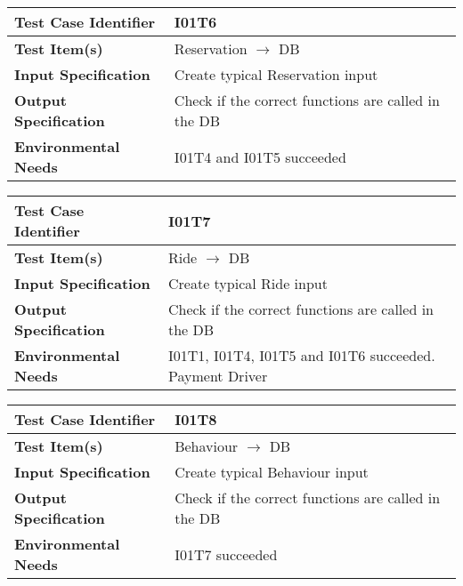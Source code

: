 \begin{center}
	\vspace{0.6cm}
	\begin{tabular}{|l|l|}
		\hline
		\textbf{Test Case Identifier} & I01T6 \bigstrut \\\hline
		\textbf{Test Item(s)} & Reservation \ensuremath{\rightarrow} DB \bigstrut \\\hline
		\textbf{Input Specification} & Create typical Reservation input \bigstrut \\\hline
		\textbf{Output Specification} & Check if the correct functions are called in the DB \bigstrut \\\hline
		\textbf{Environmental Needs} & I01T4 and I01T5 succeeded\bigstrut \\\hline
	\end{tabular}
\end{center}

\begin{center}
	\vspace{0.6cm}
	\begin{tabular}{|l|l|}
		\hline
		\textbf{Test Case Identifier} & I01T7 \bigstrut \\\hline
		\textbf{Test Item(s)} & Ride \ensuremath{\rightarrow} DB \bigstrut \\\hline
		\textbf{Input Specification} & Create typical Ride input \bigstrut \\\hline
		\textbf{Output Specification} & Check if the correct functions are called in the DB \bigstrut \\\hline
		\textbf{Environmental Needs} & I01T1, I01T4, I01T5 and I01T6 succeeded. Payment Driver\bigstrut \\\hline
	\end{tabular}
\end{center}

\begin{center}
	\vspace{0.6cm}
	\begin{tabular}{|l|l|}
		\hline
		\textbf{Test Case Identifier} & I01T8 \bigstrut \\\hline
		\textbf{Test Item(s)} & Behaviour \ensuremath{\rightarrow} DB \bigstrut \\\hline
		\textbf{Input Specification} & Create typical Behaviour input \bigstrut \\\hline
		\textbf{Output Specification} & Check if the correct functions are called in the DB \bigstrut \\\hline
		\textbf{Environmental Needs} & I01T7 succeeded \bigstrut \\\hline
	\end{tabular}
\end{center}

